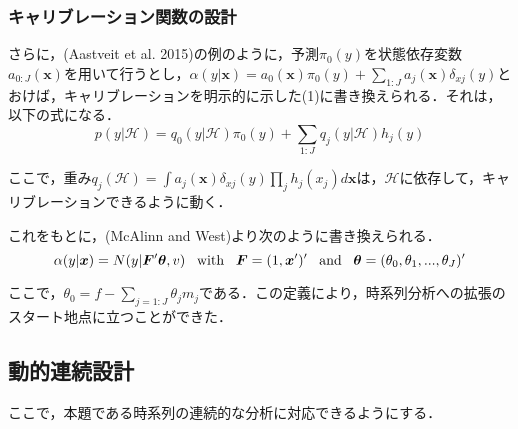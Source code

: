 \documentclass[11pt,a4paper]{article}
\begin{document}
\subsubsection{キャリブレーション関数の設計}
さらに，(Aastveit et al. 2015)の例のように，予測$\pi_0(y)$を状態依存変数$a_{0:J}({\bm x})$を用いて行うとし，$\alpha (y|{\bm x}) = a_0({\bm x})\pi_0(y)+\sum_{1:J}a_j({\bm x})\delta_{xj}(y)$とおけば，キャリブレーションを明示的に示した(1)に書き換えられる．それは，以下の式になる．
\begin{equation}
p(y|\mathcal{H}) = q_0(y|\mathcal{H})\pi_0(y)+\sum_{1:J}q_j(y|\mathcal{H})h_j(y)
\label{ons2}
\end{equation}\par
ここで，重み$q_j(\mathcal{H}) = \int a_j({\bm x})\delta_{xj}(y) \prod_j h_j(x_j)d{\bm x}$は，$\mathcal{H}$に依存して，キャリブレーションできるように動く．\par
これをもとに，(McAlinn and West)より次のように書き換えられる．
\begin{equation}
\alpha(y|{\bm x}) = N(y|{\bm F}'{\bm \theta},v) \;\;\; {\rm with} \;\;\; {\bm F} = (1,{\bm x}')' \;\;\; {\rm and} \;\;\; {\bm \theta} = (\theta_0,\theta_1,...,\theta_J)'
\label{ons3}
\end{equation}\par
ここで，$\theta_0 = f - \sum_{j=1:J}\theta_jm_j$である．この定義により，時系列分析への拡張のスタート地点に立つことができた．


\subsection{動的連続設計}
ここで，本題である時系列の連続的な分析に対応できるようにする．\par
\end{document}
